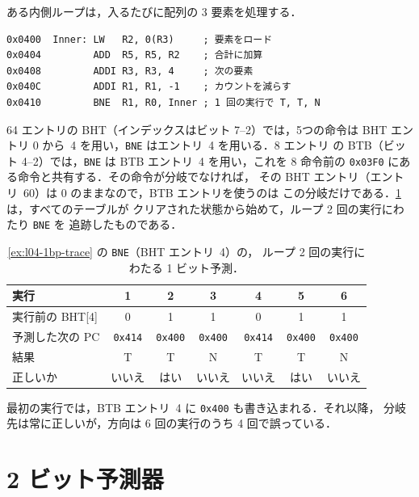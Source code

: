 \documentclass[../main.tex]{subfiles}
\begin{document}
\begin{example}
  \label{ex:l04-1bp-trace}
  ある内側ループは，入るたびに配列の 3 要素を処理する．
  \begin{lstlisting}[language={[x86masm]Assembler}, numbers=none]
0x0400  Inner: LW   R2, 0(R3)     ; 要素をロード
0x0404         ADD  R5, R5, R2    ; 合計に加算
0x0408         ADDI R3, R3, 4     ; 次の要素
0x040C         ADDI R1, R1, -1    ; カウントを減らす
0x0410         BNE  R1, R0, Inner ; 1 回の実行で T, T, N
\end{lstlisting}
  64 エントリの BHT（インデックスはビット 7--2）では，5つの命令は BHT
  エントリ 0 から~4 を用い，\texttt{BNE} はエントリ~4 を用いる．8 エントリ
  の BTB（ビット 4--2）では，\texttt{BNE} は BTB エントリ~4 を用い，これを
  8 命令前の \texttt{0x03F0} にある命令と共有する．その命令が分岐でなければ，
  その BHT エントリ（エントリ~60）は 0 のままなので，BTB エントリを使うのは
  この分岐だけである．\cref{tab:l04-1bp-trace} は，すべてのテーブルが
  クリアされた状態から始めて，ループ 2 回の実行にわたり \texttt{BNE} を
  追跡したものである．
\end{example}

\begin{table}[htbp]
  \centering\small
  \caption{\cref{ex:l04-1bp-trace} の \texttt{BNE}（BHT エントリ~4）の，
    ループ 2 回の実行にわたる 1 ビット予測．}
  \label{tab:l04-1bp-trace}
  \begin{tabular}{@{}lcccccc@{}}
    \toprule
    実行              & 1 & 2 & 3 & 4 & 5 & 6 \\
    \midrule
    実行前の BHT[4]   & 0 & 1 & 1 & 0 & 1 & 1 \\
    予測した次の PC   & \texttt{0x414} & \texttt{0x400} & \texttt{0x400} & \texttt{0x414} & \texttt{0x400} & \texttt{0x400} \\
    結果              & T & T & N & T & T & N \\
    正しいか          & いいえ & はい & いいえ & いいえ & はい & いいえ \\
    \bottomrule
  \end{tabular}
\end{table}

最初の実行では，BTB エントリ~4 に \texttt{0x400} も書き込まれる．それ以降，
分岐先は常に正しいが，方向は 6 回の実行のうち 4 回で誤っている．

\section{2 ビット予測器}
\label{sec:l04-2bp}
\end{document}
